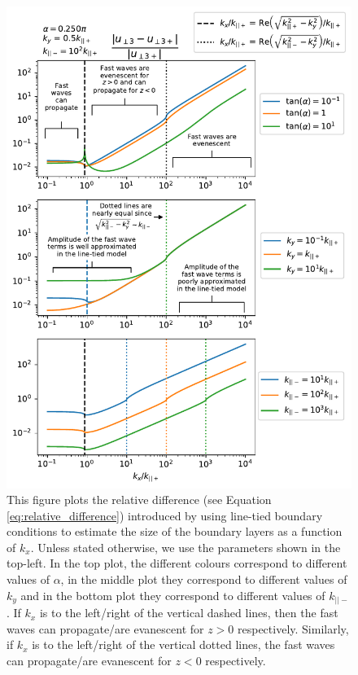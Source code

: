\documentclass[linenumbers]{aastex63}
\begin{document}
\begin{figure}
    \centering
    \includegraphics[width=17cm,height=0.88\textheight,keepaspectratio]{fast_wave_error_vs_kx.pdf}
    \caption{This figure plots the relative difference (see Equation \ref{eq:relative_difference}) introduced by using line-tied boundary conditions to estimate the size of the boundary layers as a function of $k_x$. Unless stated otherwise, we use the parameters shown in the top-left. In the top plot, the different colours correspond to different values of $\alpha$, in the middle plot they correspond to different values of $k_y$ and in the bottom plot they correspond to different values of $k_{||-}$. If $k_x$ is to the left/right of the vertical dashed lines, then the fast waves can propagate/are evanescent for $z>0$ respectively. Similarly, if $k_x$ is to the left/right of the vertical dotted lines, the fast waves can propagate/are evanescent for $z<0$ respectively.}
    \label{fig:fast_wave_error_vs_kx}
\end{figure}
\end{document}
